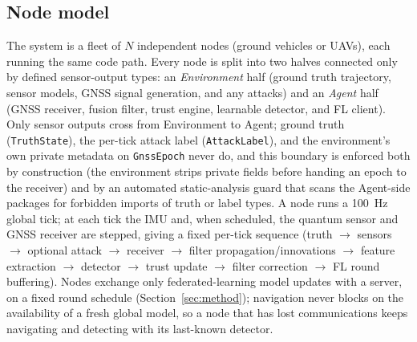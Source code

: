 \documentclass[journal]{IEEEtran}
\begin{document}
\subsection{Node model}
The system is a fleet of $N$ independent nodes (ground vehicles or UAVs), each running the same code
path. Every node is split into two halves connected only by defined sensor-output types: an
\emph{Environment} half (ground truth trajectory, sensor models, GNSS signal generation, and any
attacks) and an \emph{Agent} half (GNSS receiver, fusion filter, trust engine, learnable detector, and
FL client). Only sensor outputs cross from Environment to Agent; ground truth (\texttt{TruthState}), the
per-tick attack label (\texttt{AttackLabel}), and the environment's own private metadata on
\texttt{GnssEpoch} never do, and this boundary is enforced both by construction (the environment strips
private fields before handing an epoch to the receiver) and by an automated static-analysis guard that
scans the Agent-side packages for forbidden imports of truth or label types. A node runs a 100~Hz global
tick; at each tick the IMU and, when scheduled, the quantum sensor and GNSS receiver are stepped, giving
a fixed per-tick sequence (truth $\rightarrow$ sensors $\rightarrow$ optional attack $\rightarrow$
receiver $\rightarrow$ filter propagation/innovations $\rightarrow$ feature extraction $\rightarrow$
detector $\rightarrow$ trust update $\rightarrow$ filter correction $\rightarrow$ FL round
buffering). Nodes exchange only federated-learning model updates with a server, on a fixed round
schedule (Section~\ref{sec:method}); navigation never blocks on the availability of a fresh global
model, so a node that has lost communications keeps navigating and detecting with its last-known
detector.
\end{document}
